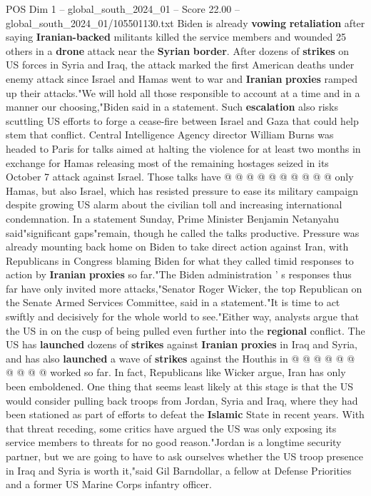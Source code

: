 \begin{textsample}{POS Dim 1 – global\_south\_2024\_01 – Score 22.00 – global\_south\_2024\_01/105501130.txt}
Biden is already \textbf{vowing} \textbf{retaliation} after saying \textbf{Iranian-backed} militants killed the service members and wounded 25 others in a \textbf{drone} attack near the \textbf{Syrian} \textbf{border}.
After dozens of \textbf{strikes} on US forces in Syria and Iraq, the attack marked the first American deaths under enemy attack since Israel and Hamas went to war and \textbf{Iranian} \textbf{proxies} ramped up their attacks."We will hold all those responsible to account at a time and in a manner our choosing,"Biden said in a statement.
Such \textbf{escalation} also risks scuttling US efforts to forge a cease-fire between Israel and Gaza that could help stem that conflict.
Central Intelligence Agency director William Burns was headed to Paris for talks aimed at halting the violence for at least two months in exchange for Hamas releasing most of the remaining hostages seized in its October 7 attack against Israel.
Those talks have @ @ @ @ @ @ @ @ @ @ only Hamas, but also Israel, which has resisted pressure to ease its military campaign despite growing US alarm about the civilian toll and increasing international condemnation.
In a statement Sunday, Prime Minister Benjamin Netanyahu said"significant gaps"remain, though he called the talks productive.
Pressure was already mounting back home on Biden to take direct action against Iran, with Republicans in Congress blaming Biden for what they called timid responses to action by \textbf{Iranian} \textbf{proxies} so far."The Biden administration ' s responses thus far have only invited more attacks,"Senator Roger Wicker, the top Republican on the Senate Armed Services Committee, said in a statement."It is time to act swiftly and decisively for the whole world to see."Either way, analysts argue that the US in on the cusp of being pulled even further into the \textbf{regional} conflict.
The US has \textbf{launched} dozens of \textbf{strikes} against \textbf{Iranian} \textbf{proxies} in Iraq and Syria, and has also \textbf{launched} a wave of \textbf{strikes} against the Houthis in @ @ @ @ @ @ @ @ @ @ worked so far.
In fact, Republicans like Wicker argue, Iran has only been emboldened.
One thing that seems least likely at this stage is that the US would consider pulling back troops from Jordan, Syria and Iraq, where they had been stationed as part of efforts to defeat the \textbf{Islamic} State in recent years.
With that threat receding, some critics have argued the US was only exposing its service members to threats for no good reason."Jordan is a longtime security partner, but we are going to have to ask ourselves whether the US troop presence in Iraq and Syria is worth it,"said Gil Barndollar, a fellow at Defense Priorities and a former US Marine Corps infantry officer.

\end{textsample}

